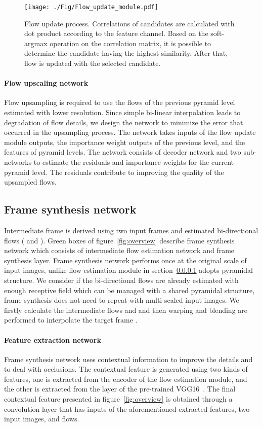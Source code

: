 \documentclass[10pt,twocolumn,letterpaper]{article}
\begin{document}
\begin{figure}
\centering
\texttt{[image: ./Fig/Flow\_update\_module.pdf]}
\caption{Flow update process. Correlations of candidates are calculated with dot product according to the feature channel. Based on the soft-argmax operation on the correlation matrix, it is possible to determine the candidate having the highest similarity. After that, flow is updated with the selected candidate.
}
\label{fig:flowUpdate}
\end{figure}




\paragraph{Flow upscaling network}

\label{section:flowupscalingnetwork}
Flow upsampling is required to use the flows of the previous pyramid level estimated with lower resolution. 
Since simple bi-linear interpolation leads to degradation of flow details, we design the network to minimize the error that occurred in the upsampling process.
The network takes inputs of the flow update module outputs, the importance weight outputs of the previous level, and the features of pyramid levels.
The network consists of decoder network and two sub-networks to estimate the residuals and importance weights for the current pyramid level. 
The residuals contribute to improving the quality of the upsampled flows.

\subsection{Frame synthesis network}
Intermediate frame is derived using two input frames and estimated bi-directional flows ( and ). 
Green boxes of figure~\ref{fig:overview} describe frame synthesis network which consists of intermediate flow estimation network and frame synthesis layer.
Frame synthesis network performs once at the original scale of input images, unlike flow estimation module in section~\ref{section:flowupscalingnetwork} adopts pyramidal structure. 
We consider if the bi-directional flows are already estimated with enough receptive field which can be managed with a shared pyramidal structure, frame synthesis does not need to repeat with multi-scaled input images. 
We firstly calculate the intermediate flows  and  and then warping and blending are performed to interpolate the target frame .

\paragraph{Feature extraction network}
Frame synthesis network uses contextual information to improve the details and to deal with occlusions. 
The contextual feature is generated using two kinds of features, one is extracted from the encoder of the flow estimation module, and the other is extracted from the  layer of the pre-trained VGG16~\cite{simonyan2014very}. 
The final contextual feature presented in figure~\ref{fig:overview} is obtained through a convolution layer that has inputs of the aforementioned extracted features, two input images, and flows.
\end{document}
